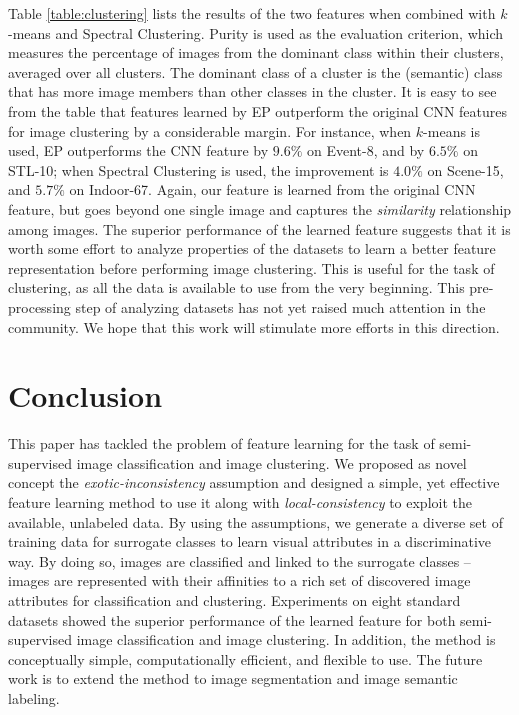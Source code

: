 Table \ref{table:clustering} lists the results of the two features
when combined with $k$-means and Spectral Clustering.  Purity is used
as the evaluation criterion, which measures the percentage of images
from the dominant class within their clusters, averaged over all
clusters. The dominant class of a cluster is the (semantic) class that
has more image members than other classes in the cluster.  It is easy
to see from the table that features learned by EP outperform the
original CNN features for image clustering by a considerable
margin. For instance, when $k$-means is used, EP outperforms the CNN
feature by $9.6\%$ on Event-8, and by $6.5\%$ on STL-10; when Spectral
Clustering is used, the improvement is $4.0\%$ on Scene-15, and
$5.7\%$ on Indoor-67.  Again, our feature is learned from the original
CNN feature, but goes beyond one single image and captures the
\emph{similarity} relationship among images. The superior performance
of the learned feature suggests that it is worth some effort to
analyze properties of the datasets to learn a better feature
representation before performing image clustering. This is useful for the task of clustering, as all the data is
available to use from the very beginning. This pre-processing step of
analyzing datasets has not yet raised much attention in the community. We
hope that this work will stimulate more efforts in this direction.


\section{Conclusion} 
\label{sec:conclusion}
This paper has tackled the problem of feature learning for the task of
semi-supervised image classification and image clustering.  We
proposed as novel concept the \emph{exotic-inconsi\-stency} assumption
and designed a simple, yet effective feature learning method to use it
along with \emph{local-consistency} to exploit the available,
unlabeled data. By using the assumptions, we generate a diverse set of
training data for surrogate classes to learn visual attributes in a
discriminative way.  By doing so, images are classified and linked to
the surrogate classes -- images are represented with their affinities
to a rich set of discovered image attributes for classification and
clustering. Experiments on eight standard datasets showed the superior
performance of the learned feature for both semi-supervised image
classification and image clustering. In addition, the method is
conceptually simple, computationally efficient, and flexible to use.
The future work is to extend the method to image segmentation and
image semantic labeling.

